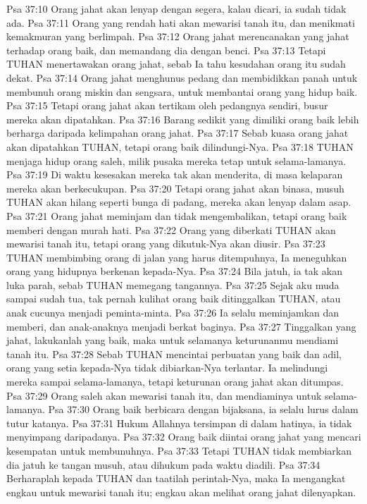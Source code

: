 Psa 37:10  Orang jahat akan lenyap dengan segera, kalau dicari, ia sudah tidak ada.
Psa 37:11  Orang yang rendah hati akan mewarisi tanah itu, dan menikmati kemakmuran yang berlimpah.
Psa 37:12  Orang jahat merencanakan yang jahat terhadap orang baik, dan memandang dia dengan benci.
Psa 37:13  Tetapi TUHAN menertawakan orang jahat, sebab Ia tahu kesudahan orang itu sudah dekat.
Psa 37:14  Orang jahat menghunus pedang dan membidikkan panah untuk membunuh orang miskin dan sengsara, untuk membantai orang yang hidup baik.
Psa 37:15  Tetapi orang jahat akan tertikam oleh pedangnya sendiri, busur mereka akan dipatahkan.
Psa 37:16  Barang sedikit yang dimiliki orang baik lebih berharga daripada kelimpahan orang jahat.
Psa 37:17  Sebab kuasa orang jahat akan dipatahkan TUHAN, tetapi orang baik dilindungi-Nya.
Psa 37:18  TUHAN menjaga hidup orang saleh, milik pusaka mereka tetap untuk selama-lamanya.
Psa 37:19  Di waktu kesesakan mereka tak akan menderita, di masa kelaparan mereka akan berkecukupan.
Psa 37:20  Tetapi orang jahat akan binasa, musuh TUHAN akan hilang seperti bunga di padang, mereka akan lenyap dalam asap.
Psa 37:21  Orang jahat meminjam dan tidak mengembalikan, tetapi orang baik memberi dengan murah hati.
Psa 37:22  Orang yang diberkati TUHAN akan mewarisi tanah itu, tetapi orang yang dikutuk-Nya akan diusir.
Psa 37:23  TUHAN membimbing orang di jalan yang harus ditempuhnya, Ia meneguhkan orang yang hidupnya berkenan kepada-Nya.
Psa 37:24  Bila jatuh, ia tak akan luka parah, sebab TUHAN memegang tangannya.
Psa 37:25  Sejak aku muda sampai sudah tua, tak pernah kulihat orang baik ditinggalkan TUHAN, atau anak cucunya menjadi peminta-minta.
Psa 37:26  Ia selalu meminjamkan dan memberi, dan anak-anaknya menjadi berkat baginya.
Psa 37:27  Tinggalkan yang jahat, lakukanlah yang baik, maka untuk selamanya keturunanmu mendiami tanah itu.
Psa 37:28  Sebab TUHAN mencintai perbuatan yang baik dan adil, orang yang setia kepada-Nya tidak dibiarkan-Nya terlantar. Ia melindungi mereka sampai selama-lamanya, tetapi keturunan orang jahat akan ditumpas.
Psa 37:29  Orang saleh akan mewarisi tanah itu, dan mendiaminya untuk selama-lamanya.
Psa 37:30  Orang baik berbicara dengan bijaksana, ia selalu lurus dalam tutur katanya.
Psa 37:31  Hukum Allahnya tersimpan di dalam hatinya, ia tidak menyimpang daripadanya.
Psa 37:32  Orang baik diintai orang jahat yang mencari kesempatan untuk membunuhnya.
Psa 37:33  Tetapi TUHAN tidak membiarkan dia jatuh ke tangan musuh, atau dihukum pada waktu diadili.
Psa 37:34  Berharaplah kepada TUHAN dan taatilah perintah-Nya, maka Ia mengangkat engkau untuk mewarisi tanah itu; engkau akan melihat orang jahat dilenyapkan.
